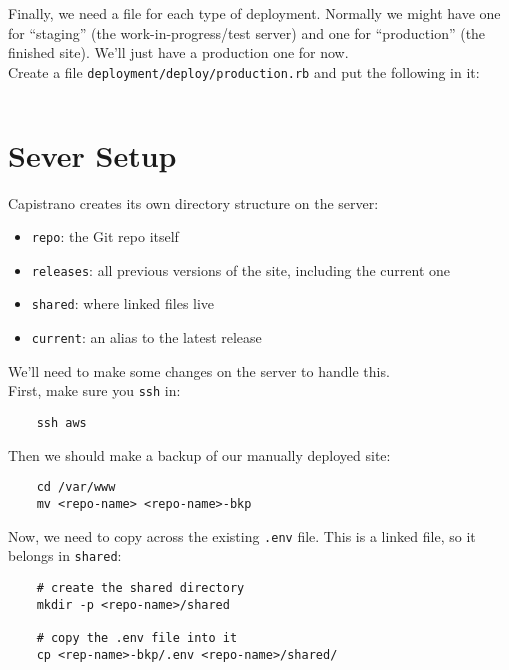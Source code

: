 Finally, we need a file for each type of deployment. Normally we might have one for ``staging'' (the work-in-progress/test server) and one for ``production'' (the finished site). We'll just have a production one for now.
\\

Create a file \texttt{deployment/deploy/production.rb} and put the following in it:

\inputminted{ruby}{20-capistrano/figures/04-production.rb}


\section{Sever Setup}

Capistrano creates its own directory structure on the server:

\begin{itemize}
    \item \texttt{repo}: the Git repo itself
    \item \texttt{releases}: all previous versions of the site, including the current one
    \item \texttt{shared}: where linked files live
    \item \texttt{current}: an alias to the latest release
\end{itemize}

We'll need to make some changes on the server to handle this.
\\

First, make sure you \texttt{ssh} in:

\begin{verbatim}
    ssh aws
\end{verbatim}

Then we should make a backup of our manually deployed site:

\begin{verbatim}
    cd /var/www
    mv <repo-name> <repo-name>-bkp
\end{verbatim}

Now, we need to copy across the existing \texttt{.env} file. This is a linked file, so it belongs in \texttt{shared}:

\begin{verbatim}
    # create the shared directory
    mkdir -p <repo-name>/shared

    # copy the .env file into it
    cp <rep-name>-bkp/.env <repo-name>/shared/
\end{verbatim}

